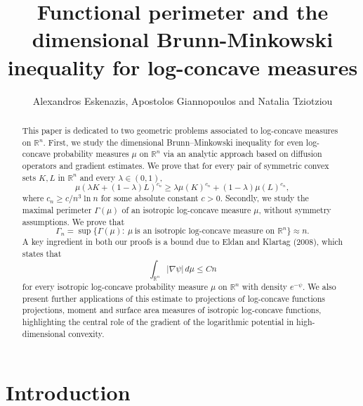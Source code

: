 \documentclass[11pt,leqno]{article}
\theoremstyle{definition}
\theoremstyle{remark}
\numberwithin{equation}{section}
\newcommand{\ls}{\leqslant}
\newcommand{\gr}{\geqslant}
\newcommand{\1}{\textbf{1}}
\newcommand{\R}{\mathbb{R}}
\begin{document}
\small


\title{\bf Functional perimeter and the dimensional Brunn-Minkowski inequality for log-concave measures}

\medskip

\author{Alexandros Eskenazis, Apostolos Giannopoulos and Natalia Tziotziou}

\date{}
\maketitle

\begin{abstract}\footnotesize
This paper is dedicated to two geometric problems associated to log-concave measures on $\R^n$. First, we study the dimensional Brunn--Minkowski inequality for even log-concave probability measures $\mu$ on $\mathbb{R}^n$ via an analytic approach based on diffusion operators and gradient estimates. We prove that for every pair of symmetric convex sets $K,L$ in $\R^n$ and every $\lambda\in(0,1)$,
$$\mu(\lambda K+(1-\lambda)L)^{c_n} \gr \lambda \mu(K)^{c_n}+(1-\lambda)\mu(L)^{c_n},$$
where $c_n\gr c/n^3\ln n$ for some absolute constant $c>0$. Secondly, we study the maximal perimeter $\Gamma(\mu)$ of an isotropic log-concave measure $\mu$, without symmetry assumptions. We prove that
$$\Gamma_n = \sup\{\Gamma(\mu): \ \mu \ \mbox{is an isotropic log-concave measure on } \R^n \} \approx n.$$
A key ingredient in both our proofs is a bound due to Eldan and Klartag (2008), which states that
$$\int_{\mathbb{R}^n} |\nabla\psi|\,d\mu \ls Cn$$ 
for every isotropic log-concave probability measure $\mu$ on $\R^n$ with density $e^{-\psi}$. 
We also present further applications of this estimate to projections of log-concave functions projections, moment and surface area measures of isotropic log-concave functions, highlighting the central role of the gradient of the logarithmic potential in high-dimensional convexity.
\end{abstract}



\section{Introduction}\label{section:1}
\end{document}

